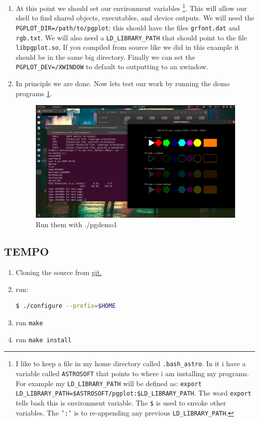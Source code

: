 \documentclass{article}
\begin{document}
\begin{enumerate}
\begin{enumerate}
    			
    \item At this point we should set our environment variables 
\footnote{I like to keep a file in my home directory called \texttt{.bash\_astro}. In it i have a variable called \texttt{ASTROSOFT} that points to where i am installing my programs. For example my \texttt{LD\_LIBRARY\_PATH} will be defined as: \texttt{export LD\_LIBRARY\_PATH=\$ASTROSOFT/pgplot:\$LD\_LIBRARY\_PATH}. The word \texttt{export} tells bash this is environment variable. The \texttt{\$} is used to envoke other variables. The \texttt{':'} is to re-appending any previous \texttt{LD\_LIBRARY\_PATH}.}. 
    			This will allow our shell to find shared objects, executables, and device outputs. We will need the \texttt{PGPLOT\_DIR=/path/to/pgplot}; this should have the files \texttt{grfont.dat} and \texttt{rgb.txt}. We will also need a \texttt{LD\_LIBRARY\_PATH} that should point to the file \texttt{libpgplot.so}, If you compiled from source like we did in this example it should be in the same big directory. Finally we can set the \texttt{PGPLOT\_DEV=/XWINDOW} to default to outputting to an xwindow. 
    			
    \item In principle we are done. Now lets test our work by running the demo programs \ref{fig:sucesfful-pgplot-install}.  
\begin{figure}[h]
\includegraphics[width=\linewidth]{Images/sucesfful-pgplot-install.png}
\caption{Run them with ./pgdemo1}
\label{fig:sucesfful-pgplot-install}  			
\end{figure}    	
\end{enumerate}   		
\end{enumerate}
    	
\subsection{TEMPO}
\begin{enumerate}
    \item Cloning the source from \href{git://git.code.sf.net/p/tempo/tempo}{git.} 
    \item run: \noindent \begin{lstlisting}[language=bash]
    $ ./configure --prefix=$HOME
    \end{lstlisting} 
    \item run \texttt{make}
    \item run \texttt{make install}
\end{enumerate}
\end{document}
